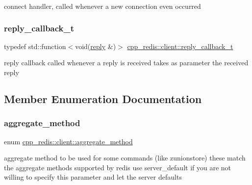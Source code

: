 connect handler, called whenever a new connection even occurred \mbox{\label{classcpp__redis_1_1client_af7a65eb21aa25230bfbb0b0203c4fc04}} 
\subsubsection{\texorpdfstring{reply\+\_\+callback\+\_\+t}{reply\_callback\_t}}
{\footnotesize\ttfamily typedef std\+::function$<$void(\mbox{\hyperlink{classcpp__redis_1_1reply}{reply}} \&)$>$ \mbox{\hyperlink{classcpp__redis_1_1client_af7a65eb21aa25230bfbb0b0203c4fc04}{cpp\+\_\+redis\+::client\+::reply\+\_\+callback\+\_\+t}}}

reply callback called whenever a reply is received takes as parameter the received reply 

\subsection{Member Enumeration Documentation}
\mbox{\label{classcpp__redis_1_1client_aa197ca5b36da793c701d3ba388ec4946}} 
\subsubsection{\texorpdfstring{aggregate\+\_\+method}{aggregate\_method}}
{\footnotesize\ttfamily enum \mbox{\hyperlink{classcpp__redis_1_1client_aa197ca5b36da793c701d3ba388ec4946}{cpp\+\_\+redis\+::client\+::aggregate\+\_\+method}}\hspace{0.3cm}{\ttfamily [strong]}}

aggregate method to be used for some commands (like zunionstore) these match the aggregate methods supported by redis use server\+\_\+default if you are not willing to specify this parameter and let the server defaults \mbox{\label{classcpp__redis_1_1client_a2e2023534299541da0a659802e2f087d}} 
